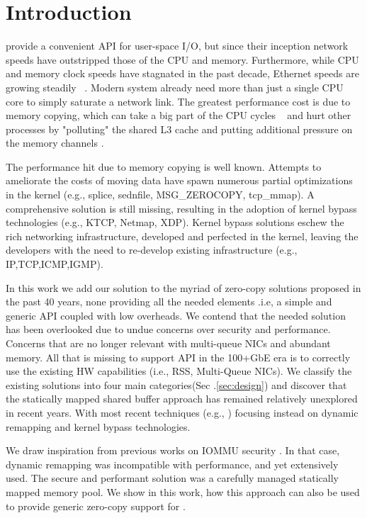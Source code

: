 \section{Introduction}
\sockets provide a convenient API for user-space I/O, but since their inception network speeds have outstripped those of the CPU and memory. Furthermore, while CPU and memory clock speeds have stagnated in the past decade, Ethernet speeds are growing steadily ~\cite{roadmap}. Modern system already need more than just a single CPU core to simply saturate a network link. The greatest performance cost is due to memory copying, which can take a big part of the CPU cycles ~\cite{desendmsg} and hurt other processes by "polluting" the shared L3 cache and putting additional pressure on the memory channels \cite{markuze2016true}. 

The performance hit due to memory copying is well known. Attempts to ameliorate the costs of moving data have spawn numerous partial optimizations in the kernel (e.g., splice, sednfile, MSG\_ZEROCOPY, tcp\_mmap). A comprehensive solution is still missing, resulting in the adoption of kernel bypass technologies (e.g., KTCP, Netmap, XDP). Kernel bypass solutions eschew the rich networking infrastructure, developed and perfected in the kernel, leaving the developers with the need to re-develop existing infrastructure (e.g., IP,TCP,ICMP,IGMP).

In this work we add our solution to the myriad of zero-copy solutions proposed in the past 40 years, none providing all the needed elements .i.e, a simple and generic API coupled with low overheads. We contend that the needed solution has been overlooked due to undue concerns over security and performance. Concerns that are no longer relevant with multi-queue NICs and abundant memory. All that is missing to support \sockets API in the 100+GbE era\cite{roadmap} is to correctly use the existing HW capabilities (i.e., RSS, Multi-Queue NICs). We classify the existing solutions into four main categories(Sec .\ref{sec:design}) and discover that the statically mapped shared buffer approach has remained relatively unexplored in recent years. With most recent techniques (e.g., \cite{xdp,dpdk,rizzo2012netmap,mikelangelo,desendmsg}) focusing instead on dynamic remapping and kernel bypass technologies.

We draw inspiration from previous works on IOMMU security \cite{markuze2016true,markuze2018damn}. In that case, dynamic remapping was incompatible with performance, and yet extensively used. The secure and performant solution was a carefully managed statically mapped memory pool. We show in this work, how this approach can also be used to provide generic zero-copy support for \sockets. 

